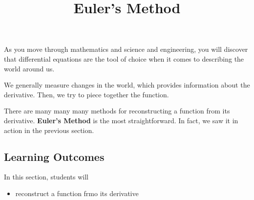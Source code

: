 \documentclass{ximera}
\title{Euler's Method}
\begin{document}
\begin{abstract}
\end{abstract}
\maketitle








As you move through mathematics and science and engineering, you will discover that differential equations are the tool of choice when it comes to describing the world around us.


We generally measure changes in the world, which provides information about the derivative.  Then, we try to piece together the function.

There are many many many methods for reconstructing a function from its derivative.  \textbf{Euler's Method} is the most straightforward.  In fact, we saw it in action in the previous section.








\subsection{Learning Outcomes}


\begin{sectionOutcomes}
In this section, students will 

\begin{itemize}
\item reconstruct a function frmo its derivative
\end{itemize}
\end{sectionOutcomes}
\end{document}
